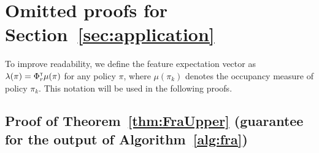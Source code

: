 \section{Omitted proofs for Section~\ref{sec:application}}
\label{app:proof_IL}

To improve readability, we define the feature expectation vector as $\lambda(\pi) = \Phi_r^\mathsf{\scriptscriptstyle T} \mu(\pi)$ for any policy $\pi$, where $\mu(\pi_k)$ denotes the occupancy measure of policy $\pi_k$. This notation will be used in the following proofs.


\subsection{Proof of Theorem~\ref{thm:FraUpper} (guarantee for the output of Algorithm~\ref{alg:fra})}

\FraUpper*

